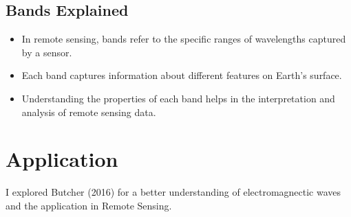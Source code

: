 \documentclass[
  letterpaper,
  DIV=11,
  numbers=noendperiod]{scrreprt}
\begin{document}
\hypertarget{bands-explained}{%
\subsection{\texorpdfstring{\textbf{Bands
Explained}}{Bands Explained}}\label{bands-explained}}

\begin{itemize}
\item
  In remote sensing, bands refer to the specific ranges of wavelengths
  captured by a sensor.
\item
  Each band captures information about different features on Earth's
  surface.
\item
  Understanding the properties of each band helps in the interpretation
  and analysis of remote sensing data.
\end{itemize}

\hypertarget{application}{%
\section{Application}\label{application}}

I explored Butcher (2016) for a better understanding of electromagnectic
waves and the application in Remote Sensing.
\end{document}
